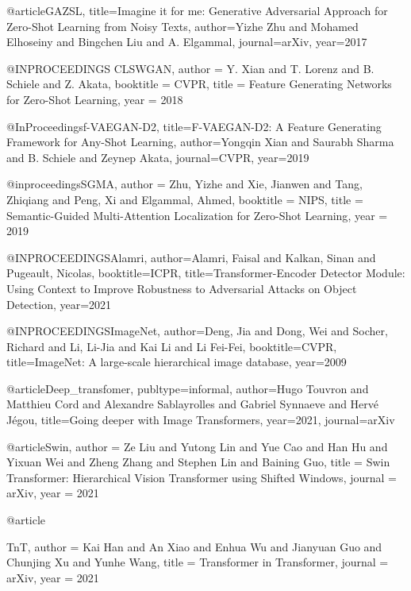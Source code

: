 @article{GAZSL,
  title={Imagine it for me: Generative Adversarial Approach for Zero-Shot Learning from Noisy Texts},
  author={Yizhe Zhu and Mohamed Elhoseiny and Bingchen Liu and A. Elgammal},
  journal={arXiv},
  year={2017}
}


@INPROCEEDINGS {CLSWGAN,
author = {Y. Xian and T. Lorenz and B. Schiele and Z. Akata},
booktitle = {CVPR},
title = {Feature Generating Networks for Zero-Shot Learning},
year = {2018}
}



@InProceedings{f-VAEGAN-D2,
  title={F-VAEGAN-D2: A Feature Generating Framework for Any-Shot Learning},
  author={Yongqin Xian and Saurabh Sharma and B. Schiele and Zeynep Akata},
  journal={CVPR},
  year={2019}}



@inproceedings{SGMA,
 author = {Zhu, Yizhe and Xie, Jianwen and Tang, Zhiqiang and Peng, Xi and Elgammal, Ahmed},
 booktitle = {NIPS},
 title = {Semantic-Guided Multi-Attention Localization for Zero-Shot Learning},
 year = {2019}
}




@INPROCEEDINGS{Alamri,  author={Alamri, Faisal and Kalkan, Sinan and Pugeault, Nicolas},  booktitle={ICPR},   title={Transformer-Encoder Detector Module: Using Context to Improve Robustness to Adversarial Attacks on Object Detection},   year={2021}}




@INPROCEEDINGS{ImageNet,  author={Deng, Jia and Dong, Wei and Socher, Richard and Li, Li-Jia and Kai Li and Li Fei-Fei},  booktitle={CVPR},   title={ImageNet: A large-scale hierarchical image database},   year={2009}}



@article{Deep_transfomer,
  publtype={informal},
  author={Hugo Touvron and Matthieu Cord and Alexandre Sablayrolles and Gabriel Synnaeve and Hervé Jégou},
  title={Going deeper with Image Transformers},
  year={2021},
  journal={arXiv}
}

@article{Swin,
  author    = {Ze Liu and
               Yutong Lin and
               Yue Cao and
               Han Hu and
               Yixuan Wei and
               Zheng Zhang and
               Stephen Lin and
               Baining Guo},
  title     = {Swin Transformer: Hierarchical Vision Transformer using Shifted Windows},
  journal   = {arXiv},
  year      = {2021}
}


@article{TnT,
  author    = {Kai Han and
               An Xiao and
               Enhua Wu and
               Jianyuan Guo and
               Chunjing Xu and
               Yunhe Wang},
  title     = {Transformer in Transformer},
  journal   = {arXiv},
  year      = {2021}
  
}


